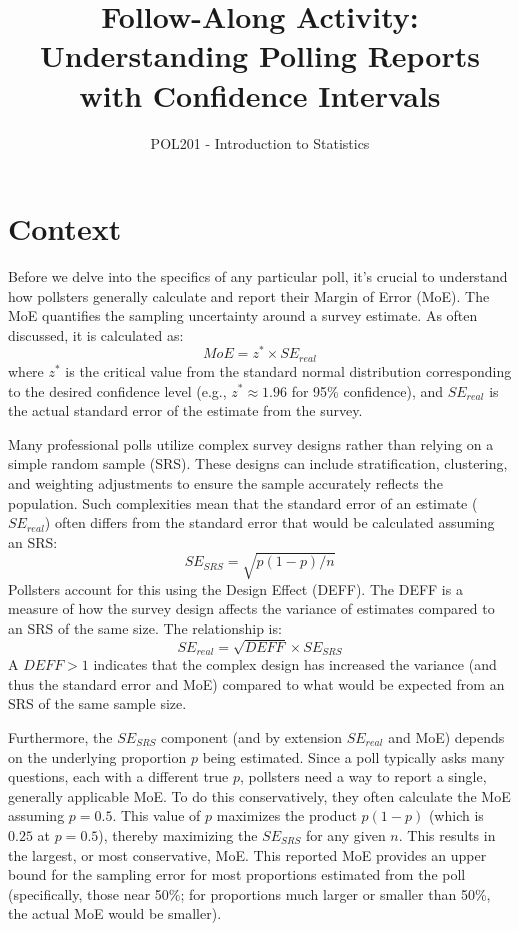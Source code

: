 \documentclass[12pt]{article}
\title{Follow-Along Activity: Understanding Polling Reports with Confidence Intervals}
\author{POL201 - Introduction to Statistics}
\date{}
\begin{document}
\maketitle

\section*{Context}
Before we delve into the specifics of any particular poll, it's crucial to understand how pollsters generally calculate and report their Margin of Error (MoE). The MoE quantifies the sampling uncertainty around a survey estimate. As often discussed, it is calculated as:
\[ MoE = z^* \times SE_{real} \]
where $z^*$ is the critical value from the standard normal distribution corresponding to the desired confidence level (e.g., $z^* \approx 1.96$ for 95\% confidence), and $SE_{real}$ is the actual standard error of the estimate from the survey.

Many professional polls utilize complex survey designs rather than relying on a simple random sample (SRS). These designs can include stratification, clustering, and weighting adjustments to ensure the sample accurately reflects the population. Such complexities mean that the standard error of an estimate ($SE_{real}$) often differs from the standard error that would be calculated assuming an SRS:
$$SE_{SRS} = \sqrt{p(1-p)/n}$$
Pollsters account for this using the Design Effect (DEFF). The DEFF is a measure of how the survey design affects the variance of estimates compared to an SRS of the same size. The relationship is:
\[ SE_{real} = \sqrt{DEFF} \times SE_{SRS} \]
A $DEFF > 1$ indicates that the complex design has increased the variance (and thus the standard error and MoE) compared to what would be expected from an SRS of the same sample size.

Furthermore, the $SE_{SRS}$ component (and by extension $SE_{real}$ and MoE) depends on the underlying proportion $p$ being estimated. Since a poll typically asks many questions, each with a different true $p$, pollsters need a way to report a single, generally applicable MoE. To do this conservatively, they often calculate the MoE assuming $p=0.5$. This value of $p$ maximizes the product $p(1-p)$ (which is $0.25$ at $p=0.5$), thereby maximizing the $SE_{SRS}$ for any given $n$. This results in the largest, or most conservative, MoE. This reported MoE provides an upper bound for the sampling error for most proportions estimated from the poll (specifically, those near 50\%; for proportions much larger or smaller than 50\%, the actual MoE would be smaller).
\end{document}
